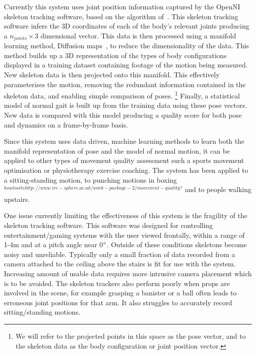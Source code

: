 \documentclass[11pt]{article} %
\begin{document}
Currently this system uses joint position information captured by the OpenNI skeleton tracking software, based on the algorithm of~\cite{Shotton2011}. This skeleton tracking software infers the 3D coordinates of each of the body's relevant joints producing a $n_{joints} \times 3$ dimensional vector. This data is then processed using a manifold learning method, Diffusion maps~\cite{Coifman2006}, to reduce the dimensionality of the data. This method builds up a 3D representation of the types of body configurations displayed in a training dataset containing footage of the motion being measured. New skeleton data is then projected onto this manifold. This effectively parameterises the motion, removing the redundant information contained in the skeleton data, and enabling simple comparison of poses. \footnote{We will refer to the projected points in this space as the pose vector, and to the skeleton data as the body configuration or joint position vector.} Finally, a statistical model of normal gait is built up from the training data using these pose vectors. New data is compared with this model producing a quality score for both pose and dynamics on a frame-by-frame basis.

Since this system uses data driven, machine learning methods to learn both the manifold representation of pose and the model of normal motion, it can be applied to other types of movement quality assessment such a sports movement optimisation or physiotherapy exercise coaching. The system has been applied to a sitting-standing motion, to punching motions in boxing $^{how to site http://www.irc-sphere.ac.uk/work-package-2/movement-quality ?}$ and to people walking upstairs. 

One issue currently limiting the effectiveness of this system is the fragility of the skeleton tracking software. This software was designed for controlling entertainment/gaming systems with the user viewed frontally, within a range of 1-4m and at a pitch angle near 0$\degree$. Outside of these conditions skeletons become noisy and unreliable. Typically only a small fraction of data recorded from a camera attached to the ceiling above the stairs is fit for use with the system. Increasing amount of usable data requires more intrusive camera placement which is to be avoided. The skeleton trackers also perform poorly when props are involved in the scene, for example grasping a banister or a ball often leads to erroneous joint positions for that arm. It also struggles to accurately record sitting/standing motions.
\end{document}
